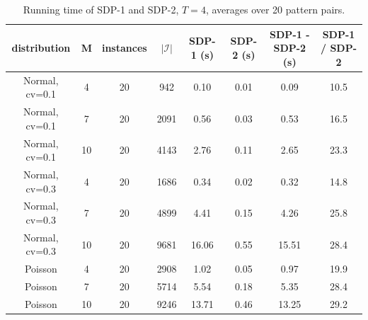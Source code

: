 \begin{table}[H]
\centering
\caption{Running time of SDP-1 and SDP-2, $T=4$, averages over 20 pattern pairs.}
\label{tab:test1_Q2_time}
\begin{tabular}{cccccccc}
\toprule
distribution & M & instances & $|\mathcal{I}|$ & SDP-1 (s) & SDP-2 (s) & SDP-1 - SDP-2 (s) & SDP-1 / SDP-2 \\
\midrule
Normal, cv=0.1 & 4 & 20 & 942 & 0.10 & 0.01 & 0.09 & 10.5 \\
Normal, cv=0.1 & 7 & 20 & 2091 & 0.56 & 0.03 & 0.53 & 16.5 \\
Normal, cv=0.1 & 10 & 20 & 4143 & 2.76 & 0.11 & 2.65 & 23.3 \\
Normal, cv=0.3 & 4 & 20 & 1686 & 0.34 & 0.02 & 0.32 & 14.8 \\
Normal, cv=0.3 & 7 & 20 & 4899 & 4.41 & 0.15 & 4.26 & 25.8 \\
Normal, cv=0.3 & 10 & 20 & 9681 & 16.06 & 0.55 & 15.51 & 28.4 \\
Poisson & 4 & 20 & 2908 & 1.02 & 0.05 & 0.97 & 19.9 \\
Poisson & 7 & 20 & 5714 & 5.54 & 0.18 & 5.35 & 28.4 \\
Poisson & 10 & 20 & 9246 & 13.71 & 0.46 & 13.25 & 29.2 \\
\bottomrule
\end{tabular}
\end{table}